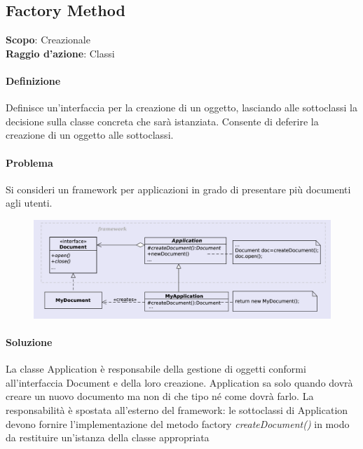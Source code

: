 \subsection{Factory Method}
\label{factory-method}

\textbf{Scopo}: Creazionale  \\
\textbf{Raggio d'azione}: Classi

\paragraph{Definizione} Definisce un'interfaccia per la creazione di un oggetto, lasciando alle sottoclassi la decisione sulla classe concreta che sarà istanziata. Consente di deferire la creazione di un oggetto alle sottoclassi.

\paragraph{Problema} Si consideri un framework per applicazioni in grado di presentare più documenti agli utenti.

\begin{figure}[H]
    \centering
    \includegraphics[width=1\linewidth]{assets/pattern/factory-method/factory-method-esempio.png}
\end{figure}

\paragraph{Soluzione} La classe Application è responsabile della gestione di oggetti conformi all’interfaccia Document e della loro creazione. Application sa solo quando dovrà creare un nuovo documento ma non di che tipo né come dovrà farlo. La responsabilità è spostata all’esterno del framework: le sottoclassi di Application devono fornire l’implementazione del metodo factory \textit{createDocument()} in modo da restituire un’istanza della classe appropriata

